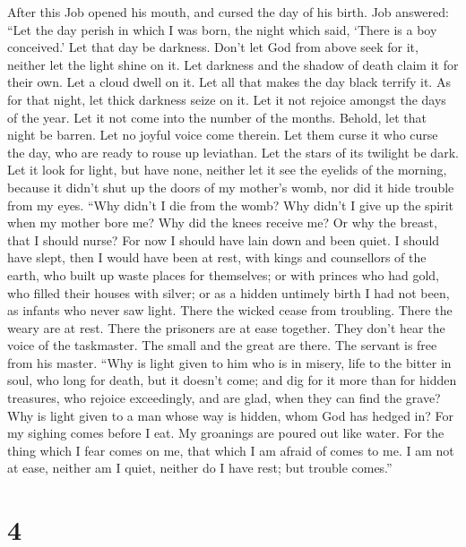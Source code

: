  After this Job opened his mouth, and cursed the day of his
birth.  Job answered:  ``Let the day perish in
which I was born, the night which said, `There is a boy conceived.'
 Let that day be darkness. Don't let God from above seek for
it, neither let the light shine on it.  Let darkness and the
shadow of death claim it for their own. Let a cloud dwell on it. Let all
that makes the day black terrify it.  As for that night, let
thick darkness seize on it. Let it not rejoice amongst the days of the
year. Let it not come into the number of the months. 
Behold, let that night be barren. Let no joyful voice come therein.
 Let them curse it who curse the day, who are ready to rouse
up leviathan.  Let the stars of its twilight be dark. Let it
look for light, but have none, neither let it see the eyelids of the
morning,  because it didn't shut up the doors of my
mother's womb, nor did it hide trouble from my eyes.  ``Why
didn't I die from the womb? Why didn't I give up the spirit when my
mother bore me?  Why did the knees receive me? Or why the
breast, that I should nurse?  For now I should have lain
down and been quiet. I should have slept, then I would have been at
rest,  with kings and counsellors of the earth, who built
up waste places for themselves;  or with princes who had
gold, who filled their houses with silver;  or as a hidden
untimely birth I had not been, as infants who never saw light.
 There the wicked cease from troubling. There the weary are
at rest.  There the prisoners are at ease together. They
don't hear the voice of the taskmaster.  The small and the
great are there. The servant is free from his master. 
``Why is light given to him who is in misery, life to the bitter in
soul,  who long for death, but it doesn't come; and dig for
it more than for hidden treasures,  who rejoice
exceedingly, and are glad, when they can find the grave? 
Why is light given to a man whose way is hidden, whom God has hedged in?
 For my sighing comes before I eat. My groanings are poured
out like water.  For the thing which I fear comes on me,
that which I am afraid of comes to me.  I am not at ease,
neither am I quiet, neither do I have rest; but trouble comes.''

\hypertarget{section-3}{%
\section{4}\label{section-3}}


